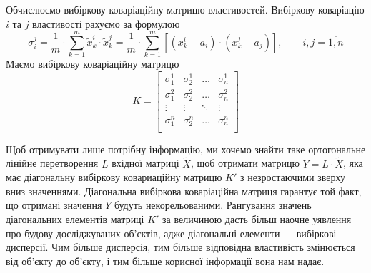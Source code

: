 Обчислюємо вибіркову коваріаційну матрицю властивостей.
Вибіркову коваріацію $i$ та $j$ властивості рахуємо за формулою
\begin{equation*}
  \sigma_i^j
  = \frac{1}{m} \cdot \sum_{k=1}^{m} \tilde{x}_k^i \cdot \tilde{x}_k^j
  = \frac{1}{m} \cdot \sum_{k=1}^{m}
    \left[ \left( x_k^i - a_i \right) \cdot \left( x_k^j - a_j \right) \right],
    \qquad i,j = \overline{1,n}
\end{equation*}
Маємо вибіркову коваріаційну матрицю
\begin{equation*}
  K = \begin{bmatrix}
    \sigma_1^1 & \sigma_2^1 & \dots  & \sigma_n^1 \\
    \sigma_1^2 & \sigma_2^2 & \dots  & \sigma_n^2 \\
    \vdots     & \vdots     & \ddots & \vdots     \\
    \sigma_1^n & \sigma_2^n & \dots  & \sigma_n^n \\
  \end{bmatrix}
\end{equation*}
\begin{comment}
\begin{equation*}
  K =
  \begin{bmatrix}
    \frac{1}{m} \cdot \sum_{k=1}^{m} \tilde{x}_k^1 \cdot \tilde{x}_k^1
    &
    \frac{1}{m} \cdot \sum_{k=1}^{m} \tilde{x}_k^1 \cdot \tilde{x}_k^2
    &
    \dots
    &
    \frac{1}{m} \cdot \sum_{k=1}^{m} \tilde{x}_k^1 \cdot \tilde{x}_k^n
    \\
    \frac{1}{m} \cdot \sum_{k=1}^{m} \tilde{x}_k^2 \cdot \tilde{x}_k^1
    &
    \frac{1}{m} \cdot \sum_{k=1}^{m} \tilde{x}_k^2 \cdot \tilde{x}_k^2
    &
    \dots
    &
    \frac{1}{m} \cdot \sum_{k=1}^{m} \tilde{x}_k^2 \cdot \tilde{x}_k^n
    \\
    \vdots & \vdots & \dots & \vdots \\
    \frac{1}{m} \cdot \sum_{k=1}^{m} \tilde{x}_k^n \cdot \tilde{x}_k^1
    &
    \frac{1}{m} \cdot \sum_{k=1}^{m} \tilde{x}_k^n \cdot \tilde{x}_k^2
    &
    \dots
    &
    \frac{1}{m} \cdot \sum_{k=1}^{m} \tilde{x}_k^n \cdot \tilde{x}_k^n
  \end{bmatrix}
\end{equation*}
\end{comment}

Щоб отримувати лише потрібну інформацію, ми хочемо знайти таке ортогональне
лінійне перетворення $L$ вхідної матриці $\tilde{X}$, щоб отримати матрицю
$Y = L \cdot \tilde{X}$, яка має діагональну вибіркову ковариаційну матрицю $K'$
з незростаючими зверху вниз значеннями.
Діагональна вибіркова коваріаційна матриця гарантує той факт, що отримані
значення $Y$ будуть некорельованими.
Рангування значень діагональних елементів матриці $K'$ за величиною дасть більш
наочне уявлення про будову досліджуваних об’єктів, адже діагональні
елементи --- вибіркові дисперсії.
Чим більше дисперсія, тим більше відповідна властивість змінюється від об’єкту
до об’єкту, і тим більше корисної інформації вона нам надає.

